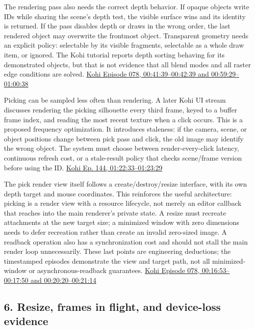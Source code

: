 The rendering pass also needs the correct depth behavior. If opaque objects write IDs while sharing the scene's depth test, the visible surface wins and its identity is returned. If the pass disables depth or draws in the wrong order, the last rendered object may overwrite the frontmost object. Transparent geometry needs an explicit policy: selectable by its visible fragments, selectable as a whole draw item, or ignored. The Kohi tutorial reports depth sorting behaving for its demonstrated objects, but that is not evidence that all blend modes and all raster edge conditions are solved. \href{https://www.youtube.com/watch?v=mx1TyxNFrdo&t=41m39s}{Kohi Episode 078, 00:41:39--00:42:39 and 00:59:29--01:00:38}

Picking can be sampled less often than rendering. A later Kohi UI stream discusses rendering the picking silhouette every third frame, keyed to a buffer frame index, and reading the most recent texture when a click occurs. This is a proposed frequency optimization. It introduces staleness: if the camera, scene, or object positions change between pick pass and click, the old image may identify the wrong object. The system must choose between render-every-click latency, continuous refresh cost, or a stale-result policy that checks scene/frame version before using the ID. \href{https://www.youtube.com/watch?v=YCYZtc2PrtY&t=1h22m33s}{Kohi Ep. 144, 01:22:33--01:23:29}

The pick render view itself follows a create/destroy/resize interface, with its own depth target and mouse coordinates. This reinforces the useful architecture: picking is a render view with a resource lifecycle, not merely an editor callback that reaches into the main renderer's private state. A resize must recreate attachments at the new target size; a minimized window with zero dimensions needs to defer recreation rather than create an invalid zero-sized image. A readback operation also has a synchronization cost and should not stall the main render loop unnecessarily. These last points are engineering deductions; the timestamped episodes demonstrate the view and target path, not all minimized-window or asynchronous-readback guarantees. \href{https://www.youtube.com/watch?v=mx1TyxNFrdo&t=16m53s}{Kohi Episode 078, 00:16:53--00:17:50 and 00:20:20--00:21:14}

\subsection{6. Resize, frames in flight, and device-loss evidence}\label{06-engine-ii-ch041-resize-frames-in-flight-and-device-loss-evidence}

